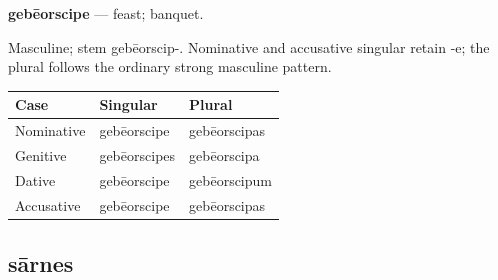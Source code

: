 \par\begin{minipage}{\linewidth}\raggedright
\textbf{gebēorscipe} — feast; banquet.

Masculine; stem gebēorscip-. Nominative and accusative singular retain -e; the plural follows the ordinary strong masculine pattern.

\par\begingroup
\fontsize{10.5}{13.2}\selectfont
\setlength{\LTleft}{0pt}\setlength{\LTright}{\fill}
\noindent
\begin{tabular}{@{}>{\raggedright\arraybackslash}p{34.82mm}>{\raggedright\arraybackslash}p{41.78mm}>{\raggedright\arraybackslash}p{41.78mm}@{}}
\toprule
\textbf{Case} & \textbf{Singular} & \textbf{Plural} \\
\midrule
Nominative & gebēorscipe & gebēorscipas \\
Genitive & gebēorscipes & gebēorscipa \\
Dative & gebēorscipe & gebēorscipum \\
Accusative & gebēorscipe & gebēorscipas \\
\bottomrule
\end{tabular}
\par\endgroup

\end{minipage}\par
{}
\subsection*{sārnes}


